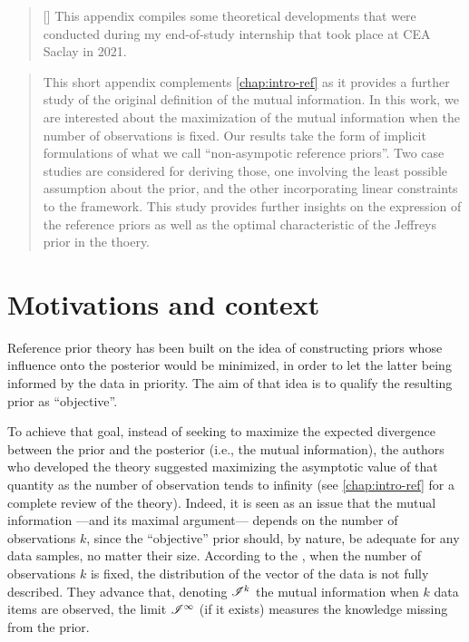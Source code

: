 

\begin{abstract}[\hspace*{-10pt}]
    This appendix compiles some theoretical developments that were conducted during my end-of-study internship that took place at CEA Saclay in 2021. %
\end{abstract}


\begin{abstract}
    This short appendix complements \cref{chap:intro-ref} as it provides a further study of the original definition of the mutual information.
    In this work, we are interested about the maximization of the mutual information when the number of observations is fixed. Our results take 
    the form of implicit formulations of  what we call ``non-asympotic reference priors''. 
    Two case studies are considered for deriving those, 
    one involving the least possible assumption about the prior, and the other incorporating linear constraints to the framework.
    This study provides further insights on the expression of the reference priors as well as the optimal characteristic of the Jeffreys prior in the thoery.
\end{abstract}


\minitoc

\section{Motivations and context}

Reference prior theory has been built on the idea of constructing  priors whose influence onto the posterior would be minimized, in order to let the latter being informed by the data in priority.
The aim of that idea is to qualify the resulting prior as ``objective''.

To achieve that goal, 
instead of seeking to maximize the expected divergence between the prior and the posterior (i.e., the mutual information), 
the authors who developed the theory \citep{bernardo_reference_1979,bernardo_bayesian_1994} suggested maximizing the asymptotic value of that quantity as the number of observation tends to infinity (see \cref{chap:intro-ref} for a complete review of the theory).
Indeed, it is seen as an issue that the mutual information ---and its maximal argument--- depends on the number of observations $k$, since the ``objective'' prior should, by nature, be adequate for any data samples, no matter their size.
According to the \citet{bernardo_bayesian_1994}, when the number of observations $k$ is fixed, the distribution of the vector of the data is not fully described. They advance that, denoting $\mathscr{I}^k$ the mutual information when $k$ data items are observed, the limit $\mathscr{I}^\infty$ (if it exists) measures the knowledge missing from the prior.



